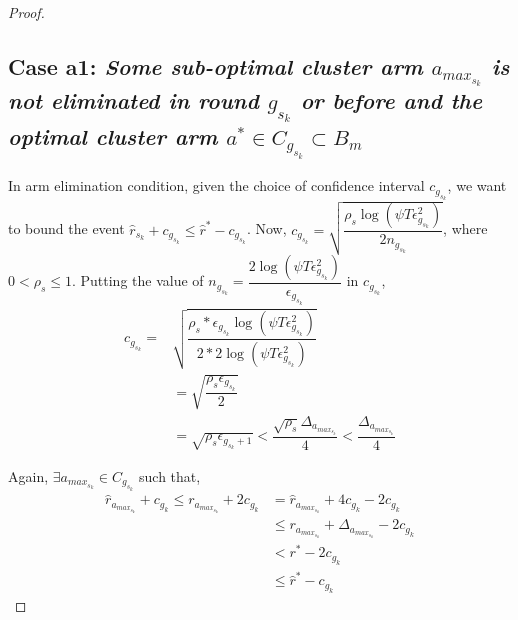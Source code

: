 \begin{proof}
\subsection*{Case a1: \textit{ Some sub-optimal cluster arm $a_{max_{s_{k}}}$ is not eliminated in round $g_{s_{k}}$ or before and the optimal cluster arm $a^{*}\in C_{g_{s_{k}}} \subset B_{m}$ }}

	In arm elimination condition, given the choice of confidence interval $c_{g_{s_{k}}}$, we want to bound the event $\hat{r}_{s_{k}}+c_{g_{s_{k}}}\leq \hat{r}^{*}-c_{g_{s_{k}}}$.
  Now, $c_{g_{s_{k}}}=\sqrt{\dfrac{\rho_{s} \log (\psi T\epsilon_{g_{s_{k}}}^{2})}{2 n_{g_{s_{k}}}}}$, where $0 < \rho_{s}\leq 1$.
  Putting the value of $n_{g_{s_{k}}}=\dfrac{2\log{(\psi T\epsilon_{g_{s_{k}}}^{2})}}{\epsilon_{g_{s_{k}}}}$ in $c_{g_{s_{k}}}$,
  \begin{align*}
  c_{g_{s_{k}}}= & \sqrt{\dfrac{\rho_{s}*\epsilon_{g_{s_{k}}}\log (\psi  T\epsilon_{g_{s_{k}}}^{2})}{2*2 \log(\psi T\epsilon_{g_{s_{k}}}^{2})}}\\
  &=\sqrt{\dfrac{\rho_{s}\epsilon_{g_{s_{k}}}}{2}}\\
  &=\sqrt{\rho_{s}\epsilon_{g_{s_{k}}+1}} < \dfrac{\sqrt{\rho_{s}}\Delta_{a_{max_{s_{k}}}}}{4} < \dfrac{\Delta_{a_{max_{s_{k}}}}}{4}
  \end{align*}

  Again, $\exists a_{max_{s_{k}}} \in C_{g_{s_{k}}}$ such that, 
  \begin{align*}
  \hat{r}_{a_{max_{s_{k}}}} + c_{g_{k}}\leq r_{a_{max_{s_{k}}}} + 2c_{g_{k}} &= \hat{r}_{a_{max_{s_{k}}}} + 4c_{g_{k}} - 2c_{g_{k}}\\
  &\leq r_{a_{max_{s_{k}}}} + \Delta_{a_{max_{s_{k}}}} - 2c_{g_{k}}\\
  &< r^{*} -2c_{g_{k}}\\
  &\leq \hat{r}^{*} - c_{g_{k}}
  \end{align*}
   

\end{proof}
